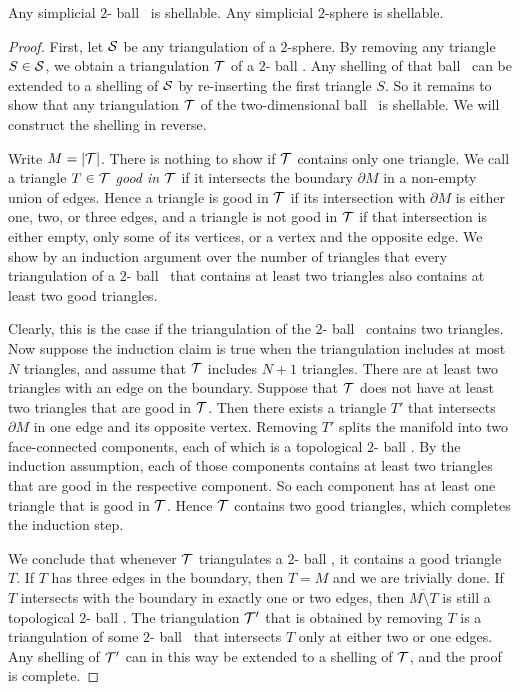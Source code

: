 \documentclass[10pt,a4paper]{article}
\newcommand\cye[1]{%
\protect\leavevmode
\begingroup
    \color{blue}%
    #1%
\endgroup
}
\newcommand{\disk}{\cye{ball}}
\begin{document}
\begin{lemma}\label{lemma:shell_2D}
    Any simplicial $2$-\disk\ is shellable.
    Any simplicial $2$-sphere is shellable. 
\end{lemma}
\begin{proof}
    First, 
    let ${\mathcal S}$ be any triangulation of a $2$-sphere. 
    By removing any triangle $S \in {\mathcal S}$, we obtain a triangulation ${\mathcal T}$ of a $2$-\disk.
    Any shelling of that \disk\ can be extended to a shelling of ${\mathcal S}$ by re-inserting the first triangle $S$.
    So it remains to show that any triangulation ${\mathcal T}$ of the two-dimensional \disk\ is shellable. 
    We will construct the shelling in reverse. 
    
    Write $M = |{\mathcal T}|$. 
    There is nothing to show if ${\mathcal T}$ contains only one triangle. 
    We call a triangle $T \in {\mathcal T}$ \emph{good in ${\mathcal T}$} if it intersects the boundary $\partial M$ in a non-empty union of edges. 
    Hence a triangle is good in ${\mathcal T}$ if its intersection with $\partial M$ is either one, two, or three edges,
    and a triangle is not good in ${\mathcal T}$ if that intersection is either empty, only some of its vertices, or a vertex and the opposite edge.
    We show by an induction argument over the number of triangles that every triangulation of a $2$-\disk\ that contains at least two triangles also contains at least two good triangles. 

    Clearly, this is the case if the triangulation of the $2$-\disk\ contains two triangles. 
    Now suppose the induction claim is true when the triangulation includes at most $N$ triangles,
    and assume that ${\mathcal T}$ includes $N+1$ triangles. 
    There are at least two triangles with an edge on the boundary. 
    Suppose that ${\mathcal T}$ does not have at least two triangles that are good in ${\mathcal T}$.
    Then there exists a triangle $T'$ that intersects $\partial M$ 
    in one edge and its opposite vertex.
    Removing $T'$ splits the manifold into two face-connected components, each of which is a topological $2$-\disk.
    By the induction assumption, each of those components contains at least two triangles 
    that are good in the respective component. 
    So each component has at least one triangle that is good in ${\mathcal T}$. 
    Hence ${\mathcal T}$ contains two good triangles, which completes the induction step. 
    
    We conclude that whenever ${\mathcal T}$ triangulates a $2$-\disk,
    it contains a good triangle $T$. 
    If $T$ has three edges in the boundary, then $T = M$ and we are trivially done. 
    If $T$ intersects with the boundary in exactly one or two edges, 
    then $\overline{M \setminus T}$ is still a topological $2$-\disk.
    The triangulation ${\mathcal T}'$ that is obtained by removing $T$
    is a triangulation of some $2$-\disk\ that intersects $T$ only at either two or one edges.
    Any shelling of ${\mathcal T}'$ can in this way be extended to a shelling of ${\mathcal T}$, and the proof is complete. 
\end{proof}
\end{document}

